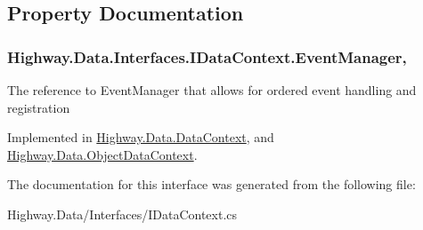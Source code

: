 \subsection{Property Documentation}
\hypertarget{interface_highway_1_1_data_1_1_interfaces_1_1_i_data_context_a66d20c659a7c50d08705534ad750e1f8}{
\subsubsection[{Event\-Manager}]{ Highway.\-Data.\-Interfaces.\-I\-Data\-Context.\-Event\-Manager\hspace{0.3cm}{\ttfamily [get]}, {\ttfamily [set]}}}\label{interface_highway_1_1_data_1_1_interfaces_1_1_i_data_context_a66d20c659a7c50d08705534ad750e1f8}


The reference to Event\-Manager that allows for ordered event handling and registration 



Implemented in \hyperlink{class_highway_1_1_data_1_1_data_context_aebad01f13573f0ec22ab8a388c3093fd}{Highway.\-Data.\-Data\-Context}, and \hyperlink{class_highway_1_1_data_1_1_object_data_context_a1be407a6d9a2d147511ca72d6a09ff49}{Highway.\-Data.\-Object\-Data\-Context}.



The documentation for this interface was generated from the following file\-:\begin{DoxyCompactItemize}
\item 
Highway.\-Data/\-Interfaces/I\-Data\-Context.\-cs\end{DoxyCompactItemize}
